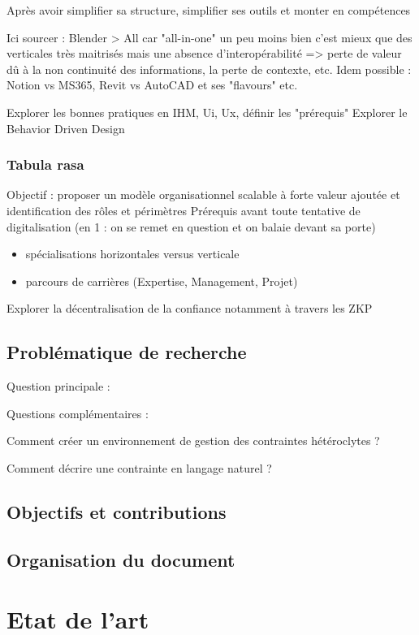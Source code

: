 \documentclass[a4paper,12pt]{article}
\begin{document}
Après avoir simplifier sa structure, simplifier ses outils et monter en compétences

Ici sourcer : Blender > All car "all-in-one" un peu moins bien c'est mieux que des verticales très maitrisés mais une absence d'interopérabilité => perte de valeur dû à la non continuité des informations, la perte de contexte, etc.
Idem possible : Notion vs MS365, Revit vs AutoCAD et ses "flavours"
etc.

Explorer les bonnes pratiques en IHM, Ui, Ux, définir les "prérequis" 
Explorer le Behavior Driven Design 
\subsubsection{Tabula rasa}
\label{sec:org387bc73}
Objectif : proposer un modèle organisationnel scalable à forte valeur ajoutée et identification des rôles et périmètres 
Prérequis avant toute tentative de digitalisation (en 1 : on se remet en question et on balaie devant sa porte)
\begin{itemize}
\item spécialisations horizontales versus verticale
\item parcours de carrières (Expertise, Management, Projet)
\end{itemize}

Explorer la décentralisation de la confiance notamment à travers les ZKP
\subsection{Problématique de recherche}
\label{sec:org45bc8fe}
Question principale :

Questions complémentaires :

Comment créer un environnement de gestion des contraintes hétéroclytes ?

Comment décrire une contrainte en langage naturel ?
\subsection{Objectifs et contributions}
\label{sec:orgcdf9064}

\subsection{Organisation du document}
\label{sec:orgb7ce62f}
\clearpage
\section{Etat de l'art}
\label{sec:orgc85fc05}
\end{document}
